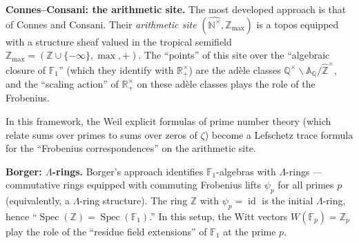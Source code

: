 \documentclass[11pt,a4paper]{article}
\theoremstyle{plain}
\theoremstyle{definition}
\newcommand{\R}{\mathbb{R}}
\newcommand{\Z}{\mathbb{Z}}
\newcommand{\N}{\mathbb{N}}
\newcommand{\Q}{\mathbb{Q}}
\newcommand{\F}{\mathbb{F}}
\newcommand{\Spec}{\operatorname{Spec}}
\begin{document}
\begin{tcolorbox}[breakable, colback=black!5, colframe=black!5,
  boxrule=0pt, sharp corners]
\textbf{Connes--Consani: the arithmetic site.}
The most developed approach is that of Connes and Consani. Their
\emph{arithmetic site} $(\widehat{\N^\times}, \Z_{\max})$ is a topos
equipped with a structure sheaf valued in the tropical semifield
$\Z_{\max} = (\Z \cup \{-\infty\}, \max, +)$. The ``points'' of this
site over the ``algebraic closure of $\F_1$'' (which they identify
with $\R_+^\times$) are the ad\`ele classes
$\Q^\times \backslash \mathbb{A}_\Q / \widehat{\Z}^\times$, and the
``scaling action'' of $\R_+^\times$ on these ad\`ele classes plays the
role of the Frobenius.

In this framework, the Weil explicit formulas of prime number theory
(which relate sums over primes to sums over zeros of $\zeta$) become
a Lefschetz trace formula for the ``Frobenius correspondences'' on
the arithmetic site.

\medskip
\textbf{Borger: $\Lambda$-rings.}
Borger's approach identifies $\F_1$-algebras with $\Lambda$-rings ---
commutative rings equipped with commuting Frobenius lifts $\psi_p$
for all primes $p$ (equivalently, a $\Lambda$-ring structure).
The ring $\Z$ with $\psi_p = \operatorname{id}$ is the initial
$\Lambda$-ring, hence ``$\Spec(\Z) = \Spec(\F_1)$.'' In this setup,
the Witt vectors $W(\F_p) = \Z_p$ play the role of the ``residue
field extensions'' of $\F_1$ at the prime $p$.
\end{tcolorbox}
\end{document}
